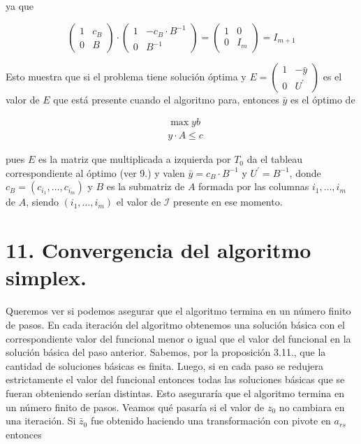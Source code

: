 \documentclass[10pt]{article}
\begin{document}
ya que

$$
\left(\begin{array}{cc}
1 & c_{B} \\
0 & B
\end{array}\right) \cdot\left(\begin{array}{cc}
1 & -c_{B} \cdot B^{-1} \\
0 & B^{-1}
\end{array}\right)=\left(\begin{array}{cc}
1 & 0 \\
0 & I_{m}
\end{array}\right)=I_{m+1}
$$

Esto muestra que si el problema tiene solución óptima y $E=\left(\begin{array}{cc}1 & -\bar{y} \\ 0 & U^{\prime}\end{array}\right)$ es el valor de $E$ que está presente cuando el algoritmo para, entonces $\bar{y}$ es el óptimo de

$$
\begin{aligned}
& \max y b \\
& y \cdot A \leq c
\end{aligned}
$$

pues $E$ es la matriz que multiplicada a izquierda por $T_{0}$ da el tableau correspondiente al óptimo (ver 9.) y valen $\bar{y}=c_{B} \cdot B^{-1}$ y $U^{\prime}=B^{-1}$, donde $c_{B}=\left(c_{i_{1}}, \ldots, c_{i_{m}}\right)$ y $B$ es la submatriz de $A$ formada por las columnas $i_{1}, \ldots, i_{m}$ de $A$, siendo $\left(i_{1}, \ldots, i_{m}\right)$ el valor de $\mathcal{I}$ presente en ese momento.

\section*{11. Convergencia del algoritmo simplex.}
Queremos ver si podemos asegurar que el algoritmo termina en un número finito de pasos. En cada iteración del algoritmo obtenemos una solución básica con el correspondiente valor del funcional menor o igual que el valor del funcional en la solución básica del paso anterior. Sabemos, por la proposición 3.11., que la\\
cantidad de soluciones básicas es finita. Luego, si en cada paso se redujera estrictamente el valor del funcional entonces todas las soluciones básicas que se fueran obteniendo serían distintas. Esto aseguraría que el algoritmo termina en un número finito de pasos. Veamos qué pasaría si el valor de $z_{0}$ no cambiara en una iteración. Si $\bar{z}_{0}$ fue obtenido haciendo una transformación con pivote en $a_{r s}$ entonces
\end{document}
